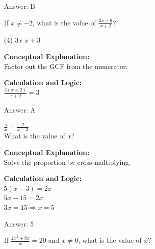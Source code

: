 \documentclass[11pt,paper=a4,answers]{exam}
\begin{document}
\begin{questions}
\begin{solution}
\vspace{25pt}

Answer: \colorbox{yellow!100}{B}
\end{solution}

\vspace{40pt}

\question
If $x \neq -2$, what is the value of $\frac{3x+6}{x+2}$?
\begin{tasks}(4)
    \task $3x$
    \task $x+3$
\end{tasks}

\begin{solution}
\textbf{Conceptual Explanation:} \\
Factor out the GCF from the numerator.

\vspace{20pt}

\textbf{Calculation and Logic:} \\
$\frac{3(x+2)}{x+2} = 3$

\vspace{25pt}

Answer: \colorbox{yellow!100}{A}
\end{solution}

\vspace{40pt}

\question
$\frac{5}{x} = \frac{2}{x-3}$ \\
What is the value of $x$?

\begin{solution}
\textbf{Conceptual Explanation:} \\
Solve the proportion by cross-multiplying.

\vspace{20pt}

\textbf{Calculation and Logic:} \\
$5(x-3) = 2x$ \\
$5x - 15 = 2x$ \\
$3x = 15 \Rightarrow x = 5$

\vspace{25pt}

Answer: \colorbox{yellow!100}{5}
\end{solution}

\vspace{40pt}

\question
If $\frac{2x^2+8x}{x} = 20$ and $x \neq 0$, what is the value of $x$?


\end{questions}
\end{document}
